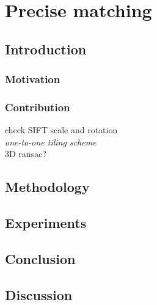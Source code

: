 
\chapter{Precise matching}
\label{chap:intro}
\minitoc

\section{Introduction}
\subsection{Motivation}
\subsection{Contribution}
check SIFT scale and rotation\\
\textit{one-to-one tiling scheme}\\
3D ransac?

\section{Methodology}

\section{Experiments}

\section{Conclusion}

\section{Discussion}
